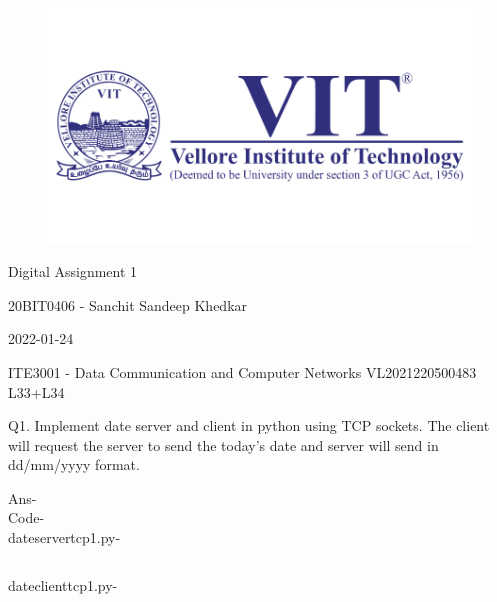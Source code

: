 \documentclass[12pt]{article}
\begin{document}
\begin{titlepage}
\NoBgThispage
   \begin{center}
        \begin{figure}[h] %
        \centering
        \includegraphics[width=15cm]{1583124354phpJTtnK5.png}
        \end{figure}

        \Huge{Digital Assignment 1}

        \vspace{0.5cm}
        \LARGE{20BIT0406 - Sanchit Sandeep Khedkar}
       
        \vspace{2.5 cm}
        \Large{2022-01-24}
        
        \vspace{0.25 cm}
        \Large{ITE3001 - Data Communication and Computer Networks}
        \large{VL2021220500483 L33+L34}
       

       \vfill
    \end{center}
\end{titlepage}
\newpage

\setcounter{page}{2}
\pagestyle{fancy}
\fancyhf{}
\rhead{\thepage}

Q1.  
Implement date server and client in python using TCP sockets. The client will request the server to send the today’s date and server will send in dd/mm/yyyy format.

Ans- \\ Code- \\ dateservertcp1.py-\inputminted{python}{dateservertcp1.py}
dateclienttcp1.py- \inputminted{python}{dateclienttcp1.py}
\newpage
\end{document}
